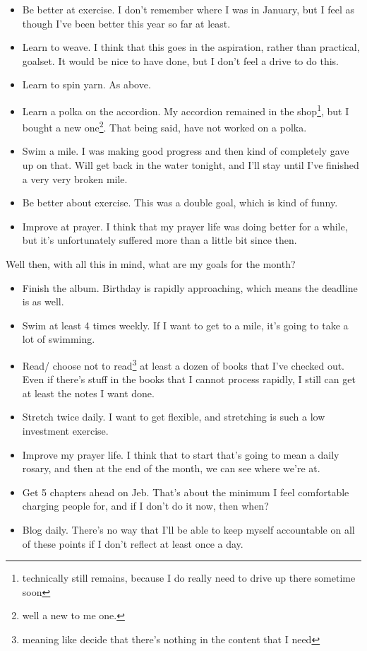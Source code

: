 \documentclass[12pt]{article}[titlepage]
\renewcommand{\,}{\textsuperscript{,}}
\begin{document}
\begin{itemize}
\item Be better at exercise. I don't remember where I was in January, but I feel as though I've been better this year so far at least.
\item Learn to weave. I think that this goes in the aspiration, rather than practical, goalset. It would be nice to have done, but I don't feel a drive to do this.
\item Learn to spin yarn. As above.
\item Learn a polka on the accordion. My accordion remained in the shop\footnote{technically still remains, because I do really need to drive up there sometime soon}, but I bought a new one\footnote{well a new to me one.}.
That being said, have not worked on a polka.
\item Swim a mile. I was making good progress and then kind of completely gave up on that. Will get back in the water tonight, and I'll stay until I've finished a very very broken mile.
\item Be better about exercise. This was a double goal, which is kind of funny.
\item Improve at prayer. I think that my prayer life was doing better for a while, but it's unfortunately suffered more than a little bit since then.
\end{itemize}

Well then, with all this in mind, what are my goals for the month?
\begin{itemize}
\item Finish the album. Birthday is rapidly approaching, which means the deadline is as well.
\item Swim at least 4 times weekly. If I want to get to a mile, it's going to take a lot of swimming.
\item Read/ choose not to read\footnote{meaning like decide that there's nothing in the content that I need} at least a dozen of books that I've checked out. Even if there's stuff in the books that I cannot process rapidly, I still can get at least the notes I want done.
\item Stretch twice daily. I want to get flexible, and stretching is such a low investment exercise.
\item Improve my prayer life. I think that to start that's going to mean a daily rosary, and then at the end of the month, we can see where we're at.
\item Get 5 chapters ahead on Jeb. That's about the minimum I feel comfortable charging people for, and if I don't do it now, then when?
\item Blog daily. There's no way that I'll be able to keep myself accountable on all of these points if I don't reflect at least once a day.
\end{itemize}
\end{document}
